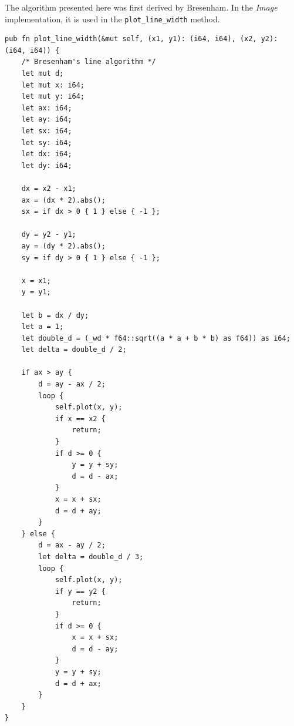 \documentclass[12pt,openany,a4,usenames,dvipsnames]{book}
\begin{document}
The algorithm presented here was first derived by Bresenham. In the \emph{Image} implementation, it is used in the \texttt{plot\_line\_width} method.
\begin{verbatim}
pub fn plot_line_width(&mut self, (x1, y1): (i64, i64), (x2, y2): (i64, i64)) {
    /* Bresenham's line algorithm */
    let mut d;
    let mut x: i64;
    let mut y: i64;
    let ax: i64;
    let ay: i64;
    let sx: i64;
    let sy: i64;
    let dx: i64;
    let dy: i64;

    dx = x2 - x1;
    ax = (dx * 2).abs();
    sx = if dx > 0 { 1 } else { -1 };

    dy = y2 - y1;
    ay = (dy * 2).abs();
    sy = if dy > 0 { 1 } else { -1 };

    x = x1;
    y = y1;

    let b = dx / dy;
    let a = 1;
    let double_d = (_wd * f64::sqrt((a * a + b * b) as f64)) as i64;
    let delta = double_d / 2;

    if ax > ay {
        d = ay - ax / 2;
        loop {
            self.plot(x, y);
            if x == x2 {
                return;
            }
            if d >= 0 {
                y = y + sy;
                d = d - ax;
            }
            x = x + sx;
            d = d + ay;
        }
    } else {
        d = ax - ay / 2;
        let delta = double_d / 3;
        loop {
            self.plot(x, y);
            if y == y2 {
                return;
            }
            if d >= 0 {
                x = x + sx;
                d = d - ay;
            }
            y = y + sy;
            d = d + ax;
        }
    }
}
\end{verbatim}
\end{document}
